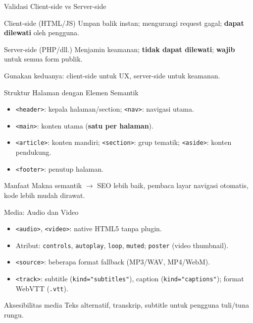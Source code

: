 \documentclass[handout]{beamer}
\begin{document}
\begin{frame}{Validasi Client-side vs Server-side}
	\begin{block}{Client-side (HTML/JS)}
		Umpan balik instan; mengurangi request gagal; \textbf{dapat dilewati} oleh pengguna.
	\end{block}
	\begin{block}{Server-side (PHP/dll.)}
		Menjamin keamanan; \textbf{tidak dapat dilewati}; \textbf{wajib} untuk semua form publik.
	\end{block}
	Gunakan keduanya: client-side untuk UX, server-side untuk keamanan.
\end{frame}

\begin{frame}{Struktur Halaman dengan Elemen Semantik}
	\begin{itemize}
		\item \texttt{<header>}: kepala halaman/section; \texttt{<nav>}: navigasi utama.
		\item \texttt{<main>}: konten utama (\textbf{satu per halaman}).
		\item \texttt{<article>}: konten mandiri; \texttt{<section>}: grup tematik; \texttt{<aside>}: konten pendukung.
		\item \texttt{<footer>}: penutup halaman.
	\end{itemize}
	\begin{block}{Manfaat}
		Makna semantik $\to$ SEO lebih baik, pembaca layar navigasi otomatis, kode lebih mudah dirawat.
	\end{block}
\end{frame}

\begin{frame}{Media: Audio dan Video}
	\begin{itemize}
		\item \texttt{<audio>}, \texttt{<video>}: native HTML5 tanpa plugin.
		\item Atribut: \texttt{controls}, \texttt{autoplay}, \texttt{loop}, \texttt{muted}; \texttt{poster} (video thumbnail).
		\item \texttt{<source>}: beberapa format fallback (MP3/WAV, MP4/WebM).
		\item \texttt{<track>}: subtitle (\texttt{kind="subtitles"}), caption (\texttt{kind="captions"}); format WebVTT (\texttt{.vtt}).
	\end{itemize}
	\begin{block}{Aksesibilitas media}
		Teks alternatif, transkrip, subtitle untuk pengguna tuli/tuna rungu.
	\end{block}
\end{frame}
\end{document}
